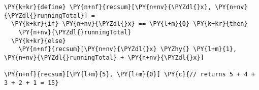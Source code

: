 \begin{Verbatim}[commandchars=\\\{\}]
\PY{k+kr}{define} \PY{n+nf}{recsum}[\PY{n+nv}{\PYZdl{}x}, \PY{n+nv}{\PYZdl{}runningTotal}] =
  \PY{k+kr}{if} \PY{n+nv}{\PYZdl{}x} == \PY{l+m}{0} \PY{k+kr}{then}
    \PY{n+nv}{\PYZdl{}runningTotal}
  \PY{k+kr}{else}
    \PY{n+nf}{recsum}[\PY{n+nv}{\PYZdl{}x} \PYZhy{} \PY{l+m}{1}, \PY{n+nv}{\PYZdl{}runningTotal} + \PY{n+nv}{\PYZdl{}x}]

\PY{n+nf}{recsum}[\PY{l+m}{5}, \PY{l+m}{0}] \PY{c}{// returns 5 + 4 + 3 + 2 + 1 = 15}
\end{Verbatim}
